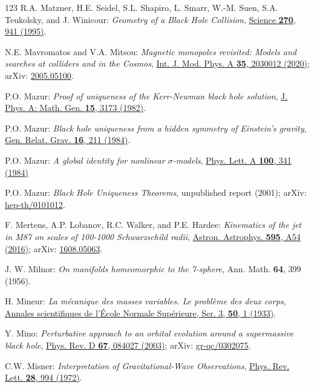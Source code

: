 \begin{thebibliography}{123}
R.A. Matzner, H.E. Seidel, S.L. Shapiro, L. Smarr, W.-M. Suen, S.A. Teukolsky, and
J. Winicour: {\em Geometry of a Black Hole Collision},
\href{https://doi.org/10.1126/science.270.5238.941}{Science {\bf 270}, 941 (1995)}.

N.E. Mavromatos and V.A. Mitsou:
{\em Magnetic monopoles revisited: Models and searches at colliders and in the Cosmos},
\href{https://doi.org/10.1142/S0217751X20300124}{Int. J. Mod. Phys. A {\bf 35}, 2030012 (2020)};
arXiv: \href{https://arxiv.org/abs/2005.05100}{2005.05100}.

P.O. Mazur:
{\em Proof of uniqueness of the Kerr-Newman black hole solution},
\href{https://doi.org/10.1088/0305-4470/15/10/021}{J. Phys. A: Math. Gen. {\bf 15}, 3173 (1982)}.

P.O. Mazur:
{\em Black hole uniqueness from a hidden symmetry of Einstein's gravity},
\href{https://doi.org/10.1007/BF00762536}{Gen. Relat. Grav. {\bf 16}, 211 (1984)}.

P.O. Mazur:
{\em A global identity for nonlinear $\sigma$-models},
\href{https://doi.org/10.1016/0375-9601(84)91084-3}{Phys. Lett. A {\bf 100}, 341 (1984)}

P.O. Mazur:
{\em Black Hole Uniqueness Theorems},
unpublished report (2001);
arXiv: \href{https://arxiv.org/abs/hep-th/0101012}{hep-th/0101012}.

F. Mertens, A.P. Lobanov, R.C. Walker, and P.E. Hardee:
{\em Kinematics of the jet in M87 on scales of 100-1000 Schwarzschild radii},
\href{https://doi.org/10.1051/0004-6361/201628829}{Astron. Astrophys. {\bf 595}, A54 (2016)};
arXiv: \href{https://arxiv.org/abs/1608.05063}{1608.05063}.

J. W. Milnor: {\em On manifolds homeomorphic to the 7-sphere},
Ann. Math. {\bf 64}, 399 (1956).

H. Mineur: {\em La mécanique des masses variables. Le problème des deux corps},
\href{https://doi.org/10.24033/asens.825}{Annales scientifiques de l'École Normale Supérieure, Ser. 3, {\bf 50}, 1 (1933)}.

Y. Mino:
{\em Perturbative approach to an orbital evolution around a supermassive black hole},
\href{https://doi.org/10.1103/PhysRevD.67.084027}{Phys. Rev. D {\bf 67}, 084027 (2003)};
arXiv: \href{https://arxiv.org/abs/gr-qc/0302075}{gr-qc/0302075}.

C.W. Misner:
{\em Interpretation of Gravitational-Wave Observations},
\href{https://doi.org/10.1103/PhysRevLett.28.994}{Phys. Rev. Lett. {\bf 28}, 994 (1972)}.


\end{thebibliography}
